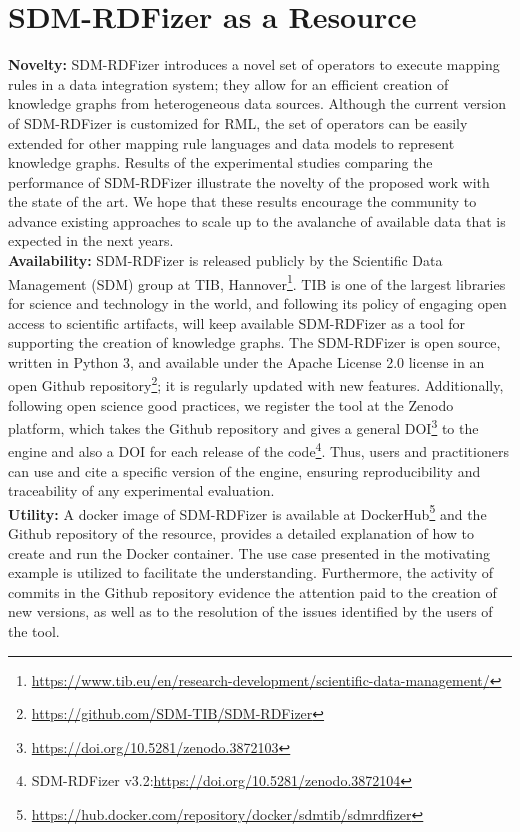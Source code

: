 \section{SDM-RDFizer as a Resource}
\label{sec:resource}
\textbf{Novelty:}
SDM-RDFizer introduces a novel set of operators to execute mapping rules in a data integration system; they allow for an efficient creation of knowledge graphs from heterogeneous data sources. Although the current version of SDM-RDFizer is customized for RML, the set of operators can be easily extended for other mapping rule languages and data models to represent knowledge graphs. Results of the experimental studies comparing the performance of SDM-RDFizer illustrate the novelty of the proposed work with the state of the art. We hope that these results encourage the community to advance existing approaches to scale up to the avalanche of available data that is expected in the next years.
\\
\textbf{Availability:}
SDM-RDFizer is released publicly by the Scientific Data Management (SDM) group at TIB, Hannover\footnote{\url{https://www.tib.eu/en/research-development/scientific-data-management/}}. 
TIB is one of the largest libraries for science and technology in the world, and following its policy of engaging open access to scientific artifacts, will keep available SDM-RDFizer as a tool for supporting the creation of knowledge graphs.  
The SDM-RDFizer is open source, written in Python 3, and available under the Apache License 2.0 license in an open Github repository\footnote{\url{https://github.com/SDM-TIB/SDM-RDFizer}}; it is regularly updated with new features. 
Additionally, following open science good practices, we register the tool at the Zenodo platform, which takes the Github repository and gives a general DOI\footnote{\url{https://doi.org/10.5281/zenodo.3872103}} to the engine and also a DOI for each release of the code\footnote{SDM-RDFizer v3.2:\url{https://doi.org/10.5281/zenodo.3872104}}. 
Thus, users and practitioners can use and cite a specific version of the engine, ensuring reproducibility and traceability of any experimental evaluation.
\\
\textbf{Utility:}
A docker image of SDM-RDFizer is available at DockerHub\footnote{\url{https://hub.docker.com/repository/docker/sdmtib/sdmrdfizer}} and the Github repository of the resource, provides a detailed explanation of how to create and run the Docker container. The use case presented in the motivating example is utilized to facilitate the understanding. Furthermore, the activity of commits in the Github repository evidence the attention paid to the creation of new versions, as well as to the resolution of the issues identified by the users of the tool.   

